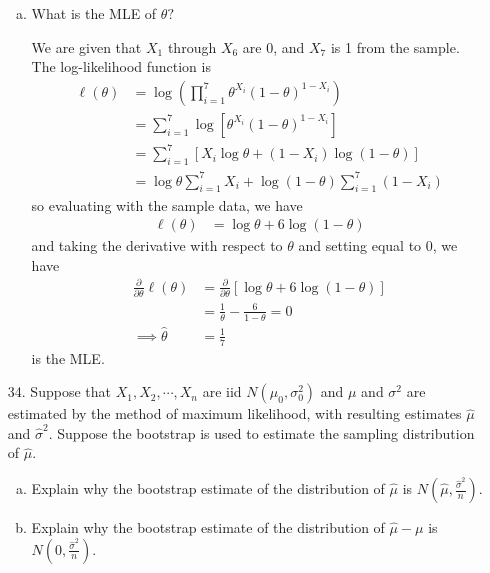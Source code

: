\documentclass{article}
\begin{document}
\begin{itemize}
\begin{enumerate}[a.]
			\item What is the MLE of $\theta?$
				\begin{soln}
					We are given that $X_1$ through $X_6$ are 0, and $X_7$ is 1 from the sample. The log-likelihood function is 
					\begin{align*}
						\ell(\theta) &= \log\left( \prod_{i=1}^7 \theta^{X_i}(1-\theta)^{1-X_i} \right) \\
						&= \sum_{i=1}^{7}\log\left[ \theta^{X_i}(1-\theta)^{1-X_i} \right] \\
						&= \sum_{i=1}^{7} \left[ X_i\log\theta + (1-X_i)\log (1-\theta) \right] \\
						&= \log\theta\sum_{i=1}^{7}X_i + \log(1-\theta)\sum_{i=1}^{7}(1-X_i)
					\end{align*} so evaluating with the sample data, we have 
					\begin{align*}
						\ell(\theta) &= \log\theta+6\log(1-\theta)
					\end{align*} and taking the derivative with respect to $\theta$ and setting equal to 0, we have 
					\begin{align*}
						\frac{\partial}{\partial\theta}\ell(\theta) &= \frac{\partial}{\partial\theta}\left[ \log\theta+6\log(1-\theta) \right] \\
						&= \frac{1}{\theta}-\frac{6}{1-\theta} = 0 \\
						\implies \hat{\theta} &= \frac{1}{7}
					\end{align*} is the MLE.
					
				\end{soln}
				
		\end{enumerate}

	\item[34.] Suppose that $X_1, X_2, \cdots, X_n$ are iid $N(\mu_0, \sigma_0^2)$ and $\mu$ and $\sigma^2$ are estimated by the method of maximum likelihood, with resulting estimates $\hat{\mu}$ and $\hat{\sigma}^2.$ Suppose the bootstrap is used to estimate the sampling distribution of $\hat{\mu}.$

		\begin{enumerate}[a.]
			\item Explain why the bootstrap estimate of the distribution of $\hat{\mu}$ is $N\left( \hat{\mu}, \frac{\hat{\sigma}^2}{n} \right).$

			\item Explain why the bootstrap estimate of the distribution of $\hat{\mu}-\mu$ is $N\left( 0, \frac{\hat{\sigma}^2}{n} \right).$


\end{enumerate}
\end{itemize}
\end{document}

